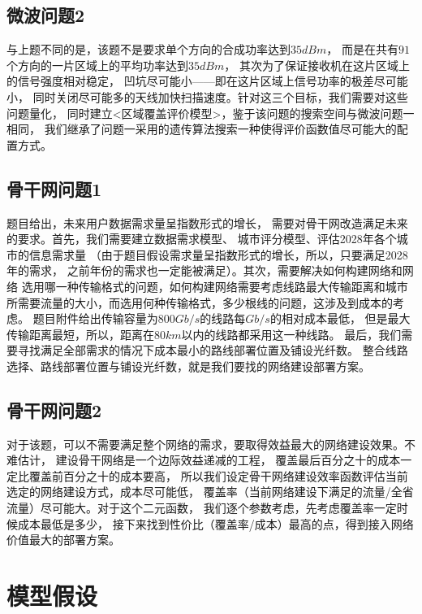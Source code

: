 \documentclass[UTF8,12pt]{ctexart}
\begin{document}
    \subsection{微波问题2}
        与上题不同的是，该题不是要求单个方向的合成功率达到$35dBm$，
        而是在共有$91$个方向的一片区域上的平均功率达到$35dBm$，
        其次为了保证接收机在这片区域上的信号强度相对稳定，
        凹坑尽可能小——即在这片区域上信号功率的极差尽可能小，
        同时关闭尽可能多的天线加快扫描速度。针对这三个目标，我们需要对这些问题量化，
        同时建立<区域覆盖评价模型>，鉴于该问题的搜索空间与微波问题一相同，
        我们继承了问题一采用的遗传算法搜索一种使得评价函数值尽可能大的配置方式。

    \subsection{骨干网问题1}
        题目给出，未来用户数据需求量呈指数形式的增长，
        需要对骨干网改造满足未来的要求。首先，我们需要建立数据需求模型、
        城市评分模型、评估2028年各个城市的信息需求量
        （由于题目假设需求量呈指数形式的增长，所以，只要满足2028年的需求，
        之前年份的需求也一定能被满足）。其次，需要解决如何构建网络和网络
        选用哪一种传输格式的问题，如何构建网络需要考虑线路最大传输距离和城市
        所需要流量的大小，而选用何种传输格式，多少根线的问题，这涉及到成本的考虑。
        题目附件给出传输容量为$800Gb/s$的线路每$Gb/s$的相对成本最低，
        但是最大传输距离最短，所以，距离在$80km$以内的线路都采用这一种线路。
        最后，我们需要寻找满足全部需求的情况下成本最小的路线部署位置及铺设光纤数。
        整合线路选择、路线部署位置与铺设光纤数，就是我们要找的网络建设部署方案。

    \subsection{骨干网问题2}
        对于该题，可以不需要满足整个网络的需求，要取得效益最大的网络建设效果。不难估计，
        建设骨干网络是一个边际效益递减的工程，
        覆盖最后百分之十的成本一定比覆盖前百分之十的成本要高，
        所以我们设定骨干网络建设效率函数评估当前选定的网络建设方式，成本尽可能低，
        覆盖率（当前网络建设下满足的流量/全省流量）尽可能大。对于这个二元函数，
        我们逐个参数考虑，先考虑覆盖率一定时候成本最低是多少，
        接下来找到性价比（覆盖率/成本）最高的点，得到接入网络价值最大的部署方案。
        
        


\newpage
\section{模型假设}\label{mxjs}
\end{document}
